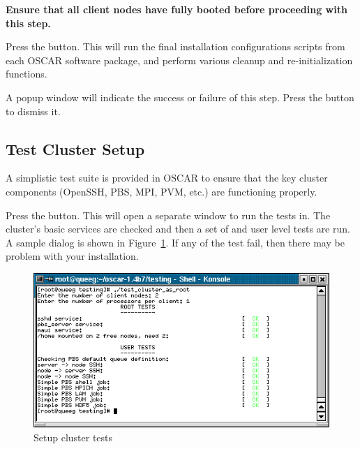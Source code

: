 {\bf Ensure that all client nodes have fully booted before proceeding
  with this step.}

Press the  button.  This will run the
final installation configurations scripts from each OSCAR software
package, and perform various cleanup and re-initialization functions.

A popup window will indicate the success or failure of this step.
Press the  button to dismiss it.


\subsection{Test Cluster Setup}
\label{det:test-cluster}
            
A simplistic test suite is provided in OSCAR to ensure that the key
cluster components (OpenSSH, PBS, MPI, PVM, etc.) are functioning
properly.

Press the  button. This will open a
separate window to run the tests in.  The cluster's basic services are
checked and then a set of  and user level tests are run. A
sample dialog is shown in Figure~\ref{fig:detailed-setup-test}. If any
of the test fail, then there may be problem with your installation.

\begin{figure}[htbp]
  \begin{center}
    \includegraphics[scale=\imgscale]{figs/8_test-cluster-complete}
    \caption{Setup cluster tests}
    \label{fig:detailed-setup-test}
  \end{center}
\end{figure}

